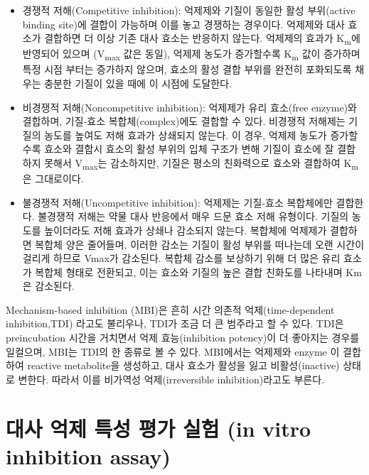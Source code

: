 \documentclass[
  11pt,
  krantz2, a4paper, twoside]{krantz}
\providecommand{\tightlist}{%
  \setlength{\itemsep}{0pt}\setlength{\parskip}{0pt}}
\begin{document}
\begin{itemize}
\tightlist
\item
  경쟁적 저해(Competitive inhibition): 억제제와 기질이 동일한 활성 부위(active binding site)에 결합이 가능하며 이를 놓고 경쟁하는 경우이다. 억제제와 대사 효소가 결합하면 더 이상 기존 대사 효소는 반응하지 않는다. 억제제의 효과가 K\textsubscript{m}에 반영되어 있으며 (V\textsubscript{max} 값은 동일), 억제제 농도가 증가할수록 K\textsubscript{m} 값이 증가하며 특정 시점 부터는 증가하지 않으며, 효소의 활성 결합 부위를 완전히 포화되도록 채우는 충분한 기질이 있을 때에 이 시점에 도달한다.
\item
  비경쟁적 저해(Noncompetitive inhibition): 억제제가 유리 효소(free enzyme)와 결합하며, 기질-효소 복합체(complex)에도 결합할 수 있다. 비경쟁적 저해제는 기질의 농도를 높여도 저해 효과가 상쇄되지 않는다. 이 경우, 억제제 농도가 증가할수록 효소와 결합시 효소의 활성 부위의 입체 구조가 변해 기질이 효소에 잘 결합하지 못해서 V\textsubscript{max}는 감소하지만, 기질은 평소의 친화력으로 효소와 결합하여 K\textsubscript{m} 은 그대로이다.
\item
  불경쟁적 저해(Uncompetitive inhibition): 억제제는 기질-효소 복합체에만 결합한다. 불경쟁적 저해는 약물 대사 반응에서 매우 드문 효소 저해 유형이다. 기질의 농도를 높이더라도 저해 효과가 상쇄나 감소되지 않는다. 복합체에 억제제가 결합하면 복합체 양은 줄어들며, 이러한 감소는 기질이 활성 부위를 떠나는데 오랜 시간이 걸리게 하므로 Vmax가 감소된다. 복합체 감소를 보상하기 위해 더 많은 유리 효소가 복합체 형태로 전환되고, 이는 효소와 기질의 높은 결합 친화도를 나타내며 Km은 감소된다.
\end{itemize}

Mechanism-based inhibition (MBI)은 흔히 시간 의존적 억제(time-dependent inhibition,TDI) 라고도 불리우나, TDI가 조금 더 큰 범주라고 할 수 있다.
TDI은 preincubation 시간을 거치면서 억제 효능(inhibition potency)이 더 좋아지는 경우를 일컬으며, MBI는 TDI의 한 종류로 볼 수 있다.
MBI에서는 억제제와 enzyme 이 결합하여 reactive metabolite을 생성하고, 대사 효소가 활성을 잃고 비활성(inactive) 상태로 변한다.
따라서 이를 비가역성 억제(irreversible inhibition)라고도 부른다.

\hypertarget{uxb300uxc0ac-uxc5b5uxc81c-uxd2b9uxc131-uxd3c9uxac00-uxc2e4uxd5d8-in-vitro-inhibition-assay}{%
\section{대사 억제 특성 평가 실험 (in vitro inhibition assay)}\label{uxb300uxc0ac-uxc5b5uxc81c-uxd2b9uxc131-uxd3c9uxac00-uxc2e4uxd5d8-in-vitro-inhibition-assay}}
\end{document}
